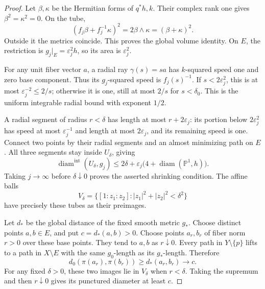 \begin{proof}
Let $\beta,\kappa$ be the Hermitian forms of $q^*h,k$. Their complex rank one gives $\beta^2=\kappa^2=0$. On the tube,
\[
 (f_j\beta+f_j^{-1}\kappa)^2
       =2\beta\wedge\kappa=(\beta+\kappa)^2.
\]
Outside it the metrics coincide. This proves the global volume identity. On $E$, the restriction is $g_j|_E=\varepsilon_j^2h$, so its area is $\varepsilon_j^2$.

For any unit fiber vector $a$, a radial ray $\gamma(s)=sa$ has $k$-squared speed one and zero base component. Thus its $g_j$-squared speed is $f_j(s)^{-1}$. If $s<2\varepsilon_j^2$, this is at most $\varepsilon_j^{-2}\leq2/s$; otherwise it is one, still at most $2/s$ for $s<\delta_0$. This is the uniform integrable radial bound with exponent $1/2$.

A radial segment of radius $r<\delta$ has length at most $r+2\varepsilon_j$: its portion below $2\varepsilon_j^2$ has speed at most $\varepsilon_j^{-1}$ and length at most $2\varepsilon_j$, and its remaining speed is one. Connect two points by their radial segments and an almost minimizing path on $E$. All three segments stay inside $U_\delta$, giving
\[
 \operatorname{diam}^{\mathrm{int}}(U_\delta,g_j)
 \leq2\delta+\varepsilon_j\bigl(4+\operatorname{diam}(\mathbb P^1,h)\bigr).
\]
Taking $j\to\infty$ before $\delta\downarrow0$ proves the asserted shrinking condition. The affine balls
\[
 V_\delta=\{[1:z_1:z_2]:|z_1|^2+|z_2|^2<\delta^2\}
\]
have precisely these tubes as their preimages.

Let $d_*$ be the global distance of the fixed smooth metric $g_*$. Choose distinct points $a,b\in E$, and put $c=d_*(a,b)>0$. Choose points $a_r,b_r$ of fiber norm $r>0$ over these base points. They tend to $a,b$ as $r\downarrow0$. Every path in $Y\setminus\{p\}$ lifts to a path in $X\setminus E$ with the same $g_0$-length as its $g_*$-length. Therefore
\[
 d_0(\pi(a_r),\pi(b_r))\geq d_*(a_r,b_r)\longrightarrow c.
\]
For any fixed $\delta>0$, these two images lie in $V_\delta$ when $r<\delta$. Taking the supremum and then $r\downarrow0$ gives its punctured diameter at least $c$.
\end{proof}
